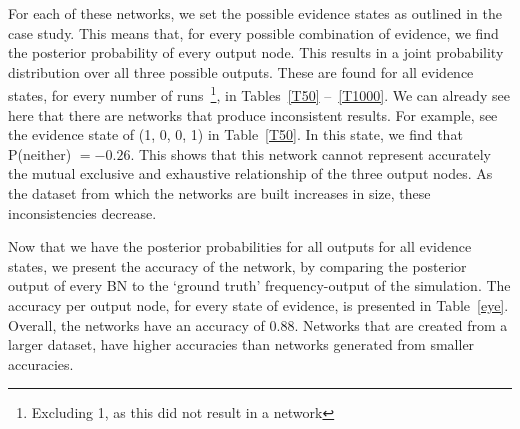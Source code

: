 \documentclass[12pt]{article}
\begin{document}
For each of these networks, we set the possible evidence states as outlined in the case study. This means that, for every possible combination of evidence, we find the posterior probability of every output node. This results in a joint probability distribution over all three possible outputs. These are found for all evidence states, for every number of runs~\footnote{Excluding 1, as this did not result in a network}, in Tables~\ref{T50} --~\ref{T1000}. We can already see here that there are networks that produce inconsistent results. For example, see the evidence state of (1, 0, 0, 1) in Table~\ref{T50}. In this state, we find that P(neither) $= -0.26$. This shows that this network cannot represent accurately the mutual exclusive and exhaustive relationship of the three output nodes. As the dataset from which the networks are built increases in size, these inconsistencies decrease.



Now that we have the posterior probabilities for all outputs for all evidence states, we present the accuracy of the network, by comparing the posterior output of every BN to the `ground truth' frequency-output of the simulation. The accuracy per output node, for every state of evidence, is presented in Table~\ref{eye}. Overall, the networks have an accuracy of 0.88. Networks that are created from a larger dataset, have higher accuracies than networks generated from smaller accuracies.
\end{document}

